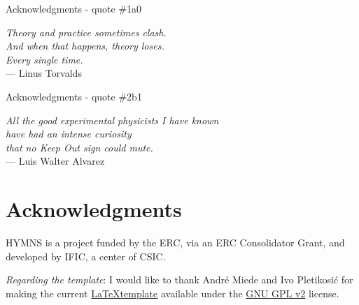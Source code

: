 
\begin{ocg}{Acknowledgments - quote \#1}{a}{0}

\begin{flushright}{\slshape
    Theory and practice sometimes clash.\\
    And when that happens, theory loses.\\
    Every single time. } \\ \medskip
    --- Linus Torvalds
\end{flushright}

\end{ocg}

\medskip

\begin{ocg}{Acknowledgments - quote \#2}{b}{1}

\begin{flushright}{\slshape
    All the good experimental physicists I have known\\
    have had an intense curiosity\\
    that no Keep Out sign could mute.} \\ \medskip
    --- Luis Walter Alvarez
\end{flushright}

\end{ocg}

\bigskip

\begingroup
\let\clearpage\relax
\let\cleardoublepage\relax
\let\cleardoublepage\relax
\chapter*{Acknowledgments}
\ac{HYMNS} is a project funded by the \ac{ERC}, via an ERC Consolidator Grant, and developed by \ac{IFIC}, a center of \ac{CSIC}.

\bigskip

\noindent\emph{Regarding the template}: I would like to thank Andr\'e Miede and Ivo Pletikosić for making the current \href{https://bitbucket.org/amiede/classicthesis/}{\LaTeX template} available under the \href{https://www.gnu.org/licenses/old-licenses/gpl-2.0.en.html}{GNU GPL v2} license.


\endgroup
